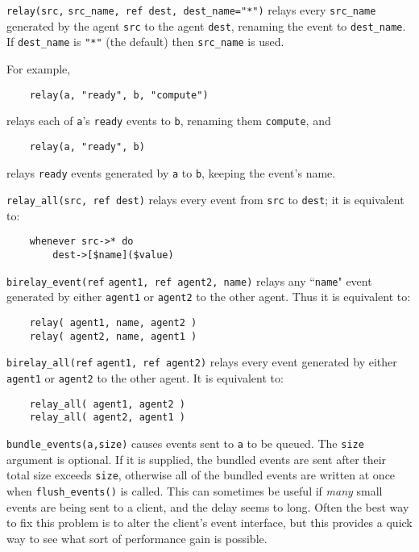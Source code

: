 \begin{sloppy}
\begin{list}{}{}
\item[{\tt relay(src,}]
{\tt src\_name, ref dest, dest\_name="*")}\label{relay-func}
relays every
{\tt src\_name} generated by the agent {\tt src} to the agent {\tt dest},
renaming the event to {\tt dest\_name}.  If {\tt dest\_name} is {\tt "*"}
(the default) then {\tt src\_name} is used.

For example,
\begin{verbatim}
    relay(a, "ready", b, "compute")
\end{verbatim}
relays each of {\tt a}'s {\tt ready} events to {\tt b}, renaming them
{\tt compute}, and
\begin{verbatim}
    relay(a, "ready", b)
\end{verbatim}
relays {\tt ready} events generated by {\tt a} to {\tt b}, keeping the event's
name.

\item[{\tt relay\_all(src, ref dest)}] \label{relay_all-func}
relays every event from {\tt src}
to {\tt dest}; it is equivalent to:
\begin{verbatim}
    whenever src->* do
        dest->[$name]($value)
\end{verbatim}

\item[{\tt birelay\_event(ref}] {\tt agent1, ref agent2, name)}
\label{birelay_event-func} 
relays any ``{\tt name}" event generated by either {\tt agent1} or {\tt agent2}
to the other agent.  Thus it is equivalent to:
\begin{verbatim}
    relay( agent1, name, agent2 )
    relay( agent2, name, agent1 )
\end{verbatim}

\item[{\tt birelay\_all(ref}] {\tt agent1, ref agent2)} \label{birelay_all-func}
relays every event
generated by either {\tt agent1} or {\tt agent2} to the other agent.
It is equivalent to:
\begin{verbatim}
    relay_all( agent1, agent2 )
    relay_all( agent2, agent1 )
\end{verbatim}

\item[{\tt bundle\_events(a,size)}] \label{bundle_events-func}
causes events sent to {\tt a} to be queued. The {\tt size} argument
is optional. If it is supplied, the bundled events are sent after
their total size exceeds {\tt size}, otherwise all of the bundled
events are written at once when {\tt flush\_events()} is called.
This can sometimes be useful if {\em many} small events are being
sent to a client, and the delay seems to long. Often the best way to
fix this problem is to alter the client's event interface, but this
provides a quick way to see what sort of performance gain is possible.


\end{list}
\end{sloppy}
